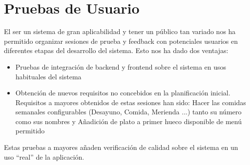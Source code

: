 \documentclass[12pt, a4paper, twoside]{book}
\begin{document}
	\section{Pruebas de Usuario}
	El ser un sistema de gran aplicabilidad y tener un público tan variado nos ha permitido organizar sesiones de prueba y feedback con potenciales usuarios en diferentes etapas del desarrollo del sistema.
	Esto nos ha dado dos ventajas:
	\begin{itemize}
		\item Pruebas de integración de backend y frontend sobre el sistema en usos habituales del sistema
		\item Obtención de nuevos requisitos no concebidos en la planificación inicial. Requisitos a mayores obtenidos de estas sesiones han sido: Hacer las comidas semanales configurables (Desayuno, Comida, Merienda ...) tanto su número como sus nombres y Añadición de plato a primer hueco disponible de menú permitido
	\end{itemize}
	Estas pruebas a mayores añaden verificación de calidad sobre el sistema en un uso ``real'' de la aplicación.
	
\end{document}
